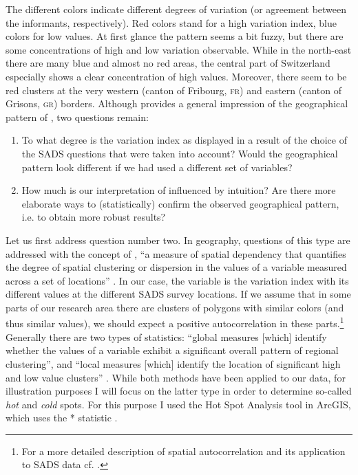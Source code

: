 \documentclass[output=paper]{LSP/langsci}
\begin{document}
The different colors indicate different degrees of variation (or agreement between the informants, respectively). Red colors stand for a high variation index, blue colors for low values. At first glance the pattern seems a bit fuzzy, but there are some concentrations of high and low variation observable. While in the north-east there are many blue and almost no red areas, the central part of Switzerland especially shows a clear concentration of high values. Moreover, there seem to be red clusters at the very western (canton of Fribourg, \textsc{fr}) and eastern (canton of Grisons, \textsc{gr}) borders. Although  provides a general impression of the geographical pattern of , two questions remain:

\begin{enumerate}
\item To what degree is the variation index as displayed in  a result of the choice of the SADS questions that were taken into account? Would the geographical pattern look different if we had used a different set of variables?
\item How much is our interpretation of  influenced by intuition? Are there more elaborate ways to (statistically) confirm the observed geographical pattern, i.e. to obtain more robust results?
\end{enumerate}

Let us first address question number two. In geography, questions of this type are addressed with the concept of , “a measure of spatial dependency that quantifies the degree of spatial clustering or dispersion in the values of a variable measured across a set of locations” \citep[34]{grieve_use_2011}. In our case, the variable is the variation index with its different values at the different SADS survey locations. If we assume that in some parts of our research area there are clusters of polygons with similar colors (and thus similar values), we should expect a positive autocorrelation in these parts.\footnote{For a more detailed description of spatial autocorrelation and its application to SADS data cf. \citet[62--63]{sibler_visualisierung_2011}.} Generally there are two types of  statistics: “global measures [which] identify whether the values of a variable exhibit a significant overall pattern of regional clustering”, and “local measures [which] identify the location of significant high and low value clusters” \citep[34]{grieve_use_2011}. While both methods have been applied to our data, for illustration purposes I will focus on the latter type in order to determine so-called \emph{hot} and \emph{cold} spots. For this purpose I used the Hot Spot Analysis tool in ArcGIS, which uses the * statistic \citep{getis_analysis_1992}.
\end{document}
